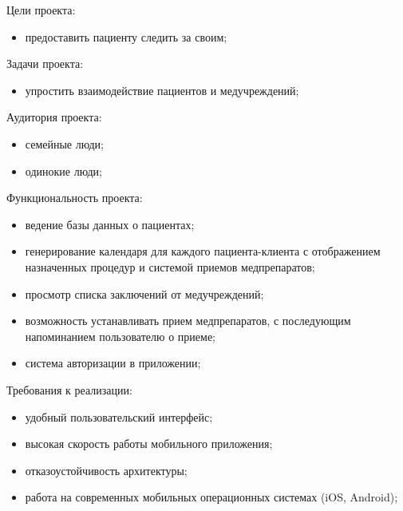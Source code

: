 Цели проекта:

\begin{itemize}
  \item предоставить пациенту следить за своим;
\end{itemize}
Задачи проекта:

\begin{itemize}
  \item упростить взаимодействие пациентов и медучреждений;
\end{itemize}
Аудитория проекта:
\begin{itemize}
  \item семейные люди;
  \item одинокие люди;
\end{itemize}
Функциональность проекта:
\begin{itemize}
  \item ведение базы данных о пациентах;
  \item генерирование календаря для каждого пациента-клиента с отображением назначенных процедур и системой приемов медпрепаратов;
  \item просмотр списка заключений от медучреждений;
  \item возможность устанавливать прием медпрепаратов, с последующим напоминанием пользователю о приеме;
  \item система авторизации в приложении;
\end{itemize}

Требования к реализации:

\begin{itemize}
  \item удобный пользовательский интерфейс;
  \item высокая скорость работы мобильного приложения;
  \item отказоустойчивость архитектуры;
  \item работа на современных мобильных операционных системах (iOS, Android);
\end{itemize}
